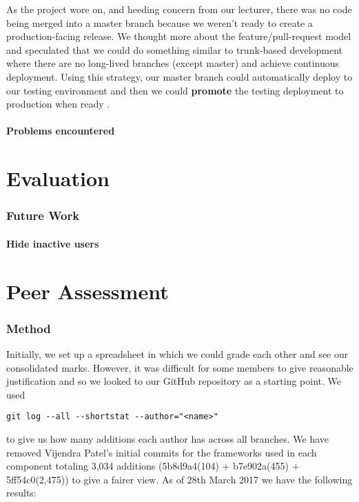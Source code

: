 \documentclass[11pt,a4paper]{report}
\begin{document}
As the project wore on, and heeding concern from our lecturer, there was no code being merged into a master branch because we weren't ready to create a production-facing release. We thought more about the feature/pull-request model and speculated that we could do something similar to trunk-based development where there are no long-lived branches (except master) and achieve continuous deployment. Using this strategy, our master branch could automatically deploy to our testing environment and then we could \textbf{promote} the testing deployment to production when ready \cite{website:thoughtworks_trunk_based_development}.

\subsubsection{Problems encountered}




\chapter{Evaluation}



\subsection{Future Work}

\subsubsection{Hide inactive users}

\chapter{Peer Assessment}

\subsection{Method}
Initially, we set up a spreadsheet in which we could grade each other and see our consolidated marks. However, it was difficult for some members to give reasonable justification and so we looked to our GitHub repository as a starting point. We used \begin{verbatim}git log --all --shortstat --author="<name>"\end{verbatim} to give us how many additions each author has across all branches. We have removed Vijendra Patel's initial commits for the frameworks used in each component totaling 3,034 additions (5b8d9a4(104) + b7e902a(455) + 5ff54c0(2,475)) to give a fairer view. As of 28th March 2017 we have the following results:
\end{document}
